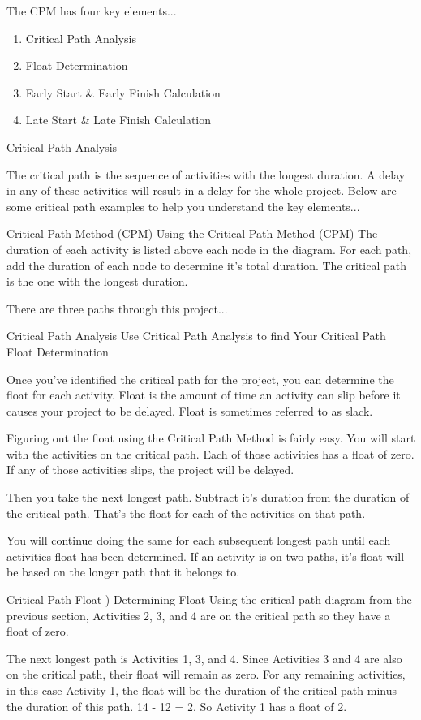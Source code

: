 The CPM has four key elements...
\begin{enumerate}
\item Critical Path Analysis
\item Float Determination
\item Early Start & Early Finish Calculation
\item Late Start & Late Finish Calculation
\end{enumerate}

Critical Path Analysis

The critical path is the sequence of activities with the longest duration. A delay in any of these activities will result in a delay for the whole project. Below are some critical path examples to help you understand the key elements...

Critical Path Method (CPM)
Using the Critical Path Method (CPM)
The duration of each activity is listed above each node in the diagram. For each path, add the duration of each node to determine it's total duration. The critical path is the one with the longest duration.

There are three paths through this project...

Critical Path Analysis
Use Critical Path Analysis to find Your Critical Path
Float Determination

Once you've identified the critical path for the project, you can determine the float for each activity. Float is the amount of time an activity can slip before it causes your project to be delayed. Float is sometimes referred to as slack.

Figuring out the float using the Critical Path Method is fairly easy. You will start with the activities on the critical path. Each of those activities has a float of zero. If any of those activities slips, the project will be delayed.

Then you take the next longest path. Subtract it's duration from the duration of the critical path. That's the float for each of the activities on that path.

You will continue doing the same for each subsequent longest path until each activities float has been determined. If an activity is on two paths, it's float will be based on the longer path that it belongs to.

Critical Path Float )
Determining Float
Using the critical path diagram from the previous section, Activities 2, 3, and 4 are on the critical path so they have a float of zero.

The next longest path is Activities 1, 3, and 4. Since Activities 3 and 4 are also on the critical path, their float will remain as zero. For any remaining activities, in this case Activity 1, the float will be the duration of the critical path minus the duration of this path. 14 - 12 = 2. So Activity 1 has a float of 2.

